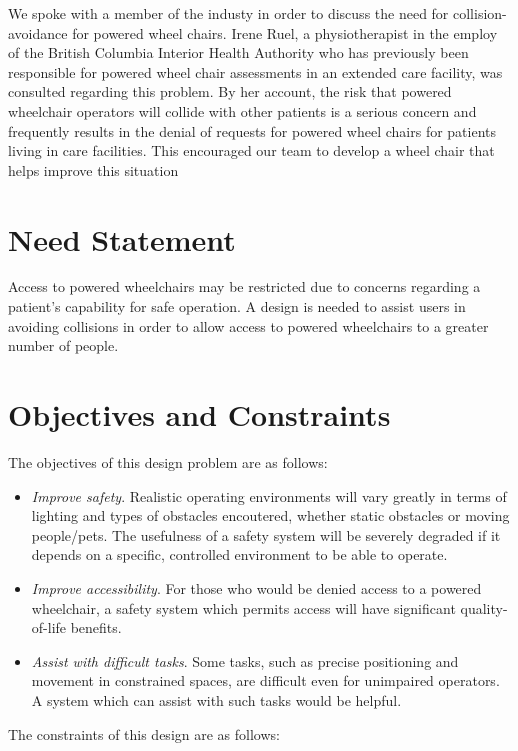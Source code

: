 \documentclass[oneside,final,a4paper]{report}
\begin{document}
We spoke with a member of the industy in order to discuss the need for collision-avoidance for powered wheel chairs. Irene Ruel, a physiotherapist in the employ of the British Columbia Interior Health Authority who has previously been responsible for powered wheel chair assessments in an extended care facility, was consulted regarding this problem. By her account, the risk that powered wheelchair operators will collide with other patients is a serious concern and frequently results in the denial of requests for powered wheel chairs for patients living in care facilities. This encouraged our team to develop a wheel chair that helps improve this situation

\section{Need Statement}
Access to powered wheelchairs may be restricted due to concerns regarding a patient's capability for safe operation. A design is needed to assist users in avoiding collisions in order to allow access to powered wheelchairs to a greater number of people.

\section{Objectives and Constraints}
The objectives of this design problem are as follows:

\begin{itemize}
 \item \emph{Improve safety}.  Realistic operating environments will vary greatly in terms of lighting and types of obstacles encoutered, whether static obstacles or moving people/pets. The usefulness of a safety system will be severely degraded if it depends on a specific, controlled environment to be able to operate.
 \item \emph{Improve accessibility}.  For those who would be denied access to a powered wheelchair, a safety system which permits access will have significant quality-of-life benefits.
 \item \emph{Assist with difficult tasks}. Some tasks, such as precise positioning and movement in constrained spaces, are difficult even for unimpaired operators.   A system which can assist with such tasks would be helpful.
\end{itemize}

The constraints of this design are as follows:
\end{document}
